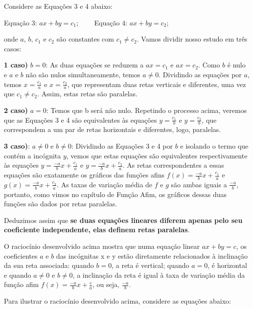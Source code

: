 \begin{example}{}

Considere as Equações 3 e 4 abaixo:

\begin{center}
Equação 3: $ax+by=c_1$; \ \ \ \ Equação 4: $ax+by=c_2$;
\end{center}

onde $a$, $b$, $c_1$ e $c_2$ são constantes com $c_1 \neq c_2$. Vamos dividir nosso estudo em três casos:

\textbf{1 caso)} $b = 0$: As duas equações se reduzem a $ax = c_1$ e $ax = c_2$. Como $b$ é nulo e $a$ e $b$ não são nulos simultaneamente, temos $a\neq0$. Dividindo as equações por $a$, temos $x=\frac{c_1}{a}$ e $x=\frac{c_2}{a}$, que representam duas retas verticais e diferentes, uma vez que $c_1\neq c_2$. Assim, estas retas são paralelas.

\textbf{2 caso)} $a = 0$: Temos que b será não nulo. Repetindo o processo acima, veremos que as Equações 3 e 4 são equivalentes às equações $y=\frac{c_1}{b}$ e $y=\frac{c_2}{b}$, que correspondem a um par de retas horizontais e diferentes, logo, paralelas.

\textbf{3 caso)}: $a\neq0$ e $b\neq0$: Dividindo as Equações 3 e 4 por $b$ e isolando o termo que contém a incógnita $y$, vemos que estas equações são equivalentes respectivamente às equações $y=\frac{-a}{b}x+\frac{c_1}{a}$ e $y=\frac{-a}{b}x+\frac{c_2}{a}$. As retas correspondentes a essas equações são exatamente os gráficos das funções afins $f(x)=\frac{-a}{b}x+\frac{c_1}{a}$ e $g(x)=\frac{-a}{b}x+\frac{c_2}{a}$. As taxas de variação média de $f$ e $g$ são ambas iguais a $\frac{-a}{b}$, portanto, como vimos no capítulo de Função Afim, os gráficos dessas duas funções são dados por retas paralelas.

Deduzimos assim que \textbf{se duas equações lineares diferem apenas pelo seu coeficiente independente, elas definem retas paralelas}.
\end{example}

O raciocínio desenvolvido acima mostra que numa equação linear $ax+ by =c$, os coeficientes $a$ e $b$ das incógnitas x e y estão diretamente relacionados à inclinação da sua reta associada: quando $b = 0$, a reta é vertical; quando $a = 0$, é horizontal e quando $a\neq0$ e $b\neq0$, a inclinação da reta é igual à taxa de variação média da função afim $f(x)=\frac{-a}{b}x+\frac{c}{a}$, ou seja, $\frac{-a}{b}$.

Para ilustrar o raciocínio desenvolvido acima, considere as equações abaixo:


